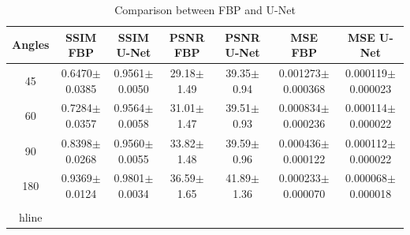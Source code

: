 
\begin{table}[ht]
\centering
\caption{Comparison between FBP and U-Net}
\begin{tabular}{c|cc|cc|cc}
\hline
Angles &
SSIM FBP &
SSIM U-Net &
PSNR FBP &
PSNR U-Net &
MSE FBP &
MSE U-Net \\
\hline
45 & 0.6470$\pm$0.0385 & 0.9561$\pm$0.0050 & 29.18$\pm$1.49 & 39.35$\pm$0.94 & 0.001273$\pm$0.000368 & 0.000119$\pm$0.000023 \\
60 & 0.7284$\pm$0.0357 & 0.9564$\pm$0.0058 & 31.01$\pm$1.47 & 39.51$\pm$0.93 & 0.000834$\pm$0.000236 & 0.000114$\pm$0.000022 \\
90 & 0.8398$\pm$0.0268 & 0.9560$\pm$0.0055 & 33.82$\pm$1.48 & 39.59$\pm$0.96 & 0.000436$\pm$0.000122 & 0.000112$\pm$0.000022 \\
180 & 0.9369$\pm$0.0124 & 0.9801$\pm$0.0034 & 36.59$\pm$1.65 & 41.89$\pm$1.36 & 0.000233$\pm$0.000070 & 0.000068$\pm$0.000018 \\
\\hline
\end{tabular}
\end{table}
